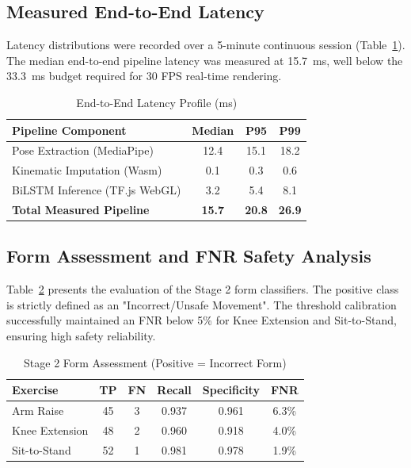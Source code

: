 \documentclass[conference]{IEEEtran}
\begin{document}
\subsection{Measured End-to-End Latency}
Latency distributions were recorded over a 5-minute continuous session (Table~\ref{tab:latency}). The median end-to-end pipeline latency was measured at 15.7~ms, well below the 33.3~ms budget required for 30 FPS real-time rendering. 

\begin{table}[htbp]
\caption{End-to-End Latency Profile (ms)}
\begin{center}
\begin{tabular}{@{}lccc@{}}
\toprule
\textbf{Pipeline Component} & \textbf{Median} & \textbf{P95} & \textbf{P99} \\ \midrule
Pose Extraction (MediaPipe) & 12.4 & 15.1 & 18.2 \\
Kinematic Imputation (Wasm) & 0.1 & 0.3 & 0.6 \\
BiLSTM Inference (TF.js WebGL) & 3.2 & 5.4 & 8.1 \\ \midrule
\textbf{Total Measured Pipeline} & \textbf{15.7} & \textbf{20.8} & \textbf{26.9} \\ \bottomrule
\end{tabular}
\label{tab:latency}
\end{center}
\end{table}

\subsection{Form Assessment and FNR Safety Analysis}
Table~\ref{tab:fnr} presents the evaluation of the Stage 2 form classifiers. The positive class is strictly defined as an "Incorrect/Unsafe Movement". The threshold calibration successfully maintained an FNR below 5\% for Knee Extension and Sit-to-Stand, ensuring high safety reliability. 

\begin{table}[htbp]
\caption{Stage 2 Form Assessment (Positive = Incorrect Form)}
\begin{center}
\begin{tabular}{@{}lccccc@{}}
\toprule
\textbf{Exercise} & \textbf{TP} & \textbf{FN} & \textbf{Recall} & \textbf{Specificity} & \textbf{FNR} \\ \midrule
Arm Raise & 45 & 3 & 0.937 & 0.961 & 6.3\% \\
Knee Extension & 48 & 2 & 0.960 & 0.918 & 4.0\% \\
Sit-to-Stand & 52 & 1 & 0.981 & 0.978 & 1.9\% \\ \bottomrule
\end{tabular}
\label{tab:fnr}
\end{center}
\end{table}
\end{document}
